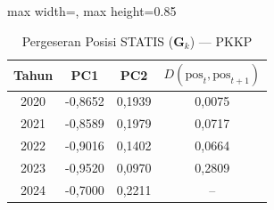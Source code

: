\begin{table}[H]
\centering
\caption{Pergeseran Posisi STATIS ($\mathbf{G}_k$) --- PKKP} \label{tab:app2jarak_statis_loading_pkkp}
\begin{adjustbox}{max width=\textwidth, max height=0.85\textheight}
\begin{tabular}{|c|c|c|c|}
\hline
\textbf{Tahun} & \textbf{PC1} & \textbf{PC2} & \textbf{$D(\text{pos}_t, \text{pos}_{t+1})$} \\
\hline
2020 & -0,8652 & 0,1939 & 0,0075 \\
2021 & -0,8589 & 0,1979 & 0,0717 \\
2022 & -0,9016 & 0,1402 & 0,0664 \\
2023 & -0,9520 & 0,0970 & 0,2809 \\
2024 & -0,7000 & 0,2211 & -- \\
\hline
\end{tabular}
\end{adjustbox}
\end{table}
